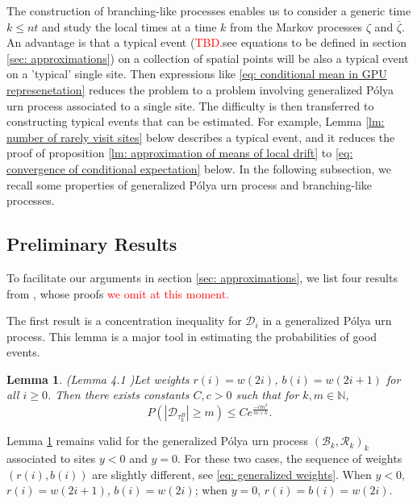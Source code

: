 \documentclass[twoside,12pt,a4paper]{article}
\newtheorem{lemma}{Lemma}[section]
\numberwithin{equation}{section}
\newcommand{\abs}[1]{\left\vert #1 \right\vert}
\newcommand\TBD{\textcolor{red}{TBD.}}
\begin{document}
		The construction of branching-like processes enables us to consider a generic time $k\leq nt$ and study the local times at a time $k$ from the Markov processes $\zeta$ and $\bar{\zeta}$. An advantage is that a typical event (\TBD{see equations to be defined in section \ref{sec: approximations}}) on a collection of spatial points will be also a typical event on a 'typical' single site. Then expressions like \eqref{eq: conditional mean in GPU represenetation} reduces the problem to a problem involving generalized P\'{o}lya urn process associated to a single site. The difficulty is then transferred to constructing typical events that can be estimated. For example, Lemma \ref{lm: number of rarely visit sites} below describes a typical event, and it reduces the proof of proposition \ref{lm: approximation of means of local drift} to \eqref{eq: convergence of conditional expectation} below. In the following subsection, we recall some properties of generalized P\'{o}lya urn process and branching-like processes.
		
		\subsection{Preliminary Results}
		To facilitate our arguments in section \ref{sec: approximations}, we list four results from \cite{KMP22,T96}, whose proofs \textcolor{red}{we omit at this moment.}
		
		The first result is a concentration inequality for $\mathcal{D}_i$ in a generalized P\'{o}lya urn process. This lemma is a major tool in estimating the probabilities of good events.
		\begin{lemma}(Lemma 4.1 \cite{KMP22})\label{lm: concentration inequality}
			Let weights $r(i) = w(2i)$, $b(i)= w(2i+1) $ for all $i\geq 0$. Then there exists constants $C,c>0$ such that for $k, m \in \mathbb{N}$,
			$$
			P\left(  \abs{ \mathcal{D}_{\tau_k^B}   } \geq m \right) \leq C e^{\frac{-cm^2}{m \vee k}}.
			$$
		\end{lemma} 
		Lemma \ref{lm: concentration inequality} remains valid for the generalized P\'{o}lya urn process $(\mathcal{B}_{k},\mathcal{R}_{k})_k$ associated to sites $y<0$ and $y=0$. For these two cases, the sequence of weights $(r(i),b(i))$ are slightly different, see \eqref{eq: generalized weights}. When $y<0$, $r(i) = w(2i+1)$, $b(i)= w(2i) $; when $y=0$, $r(i) = b(i)=w(2i)$.
		
\end{document}

